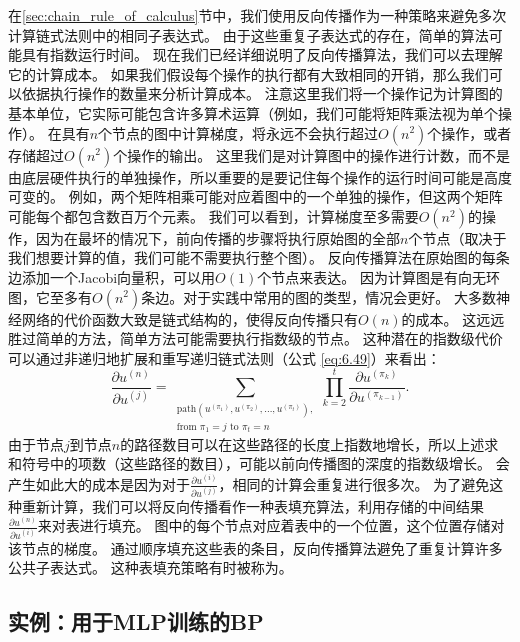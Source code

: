   
在\ref{sec:chain_rule_of_calculus}节中，我们使用反向传播作为一种策略来避免多次计算链式法则中的相同子表达式。
由于这些重复子表达式的存在，简单的算法可能具有指数运行时间。
现在我们已经详细说明了反向传播算法，我们可以去理解它的计算成本。
如果我们假设每个操作的执行都有大致相同的开销，那么我们可以依据执行操作的数量来分析计算成本。
注意这里我们将一个操作记为计算图的基本单位，它实际可能包含许多算术运算（例如，我们可能将矩阵乘法视为单个操作）。
在具有$n$个节点的图中计算梯度，将永远不会执行超过$O(n^2)$个操作，或者存储超过$O(n^2)$个操作的输出。
这里我们是对计算图中的操作进行计数，而不是由底层硬件执行的单独操作，所以重要的是要记住每个操作的运行时间可能是高度可变的。
例如，两个矩阵相乘可能对应着图中的一个单独的操作，但这两个矩阵可能每个都包含数百万个元素。
我们可以看到，计算梯度至多需要$O(n^2)$的操作，因为在最坏的情况下，前向传播的步骤将执行原始图的全部$n$个节点（取决于我们想要计算的值，我们可能不需要执行整个图）。
反向传播算法在原始图的每条边添加一个Jacobi向量积，可以用$O(1)$个节点来表达。
因为计算图是有向无环图，它至多有$O(n^2)$条边。对于实践中常用的图的类型，情况会更好。
大多数神经网络的代价函数大致是链式结构的，使得反向传播只有$O(n)$的成本。
这远远胜过简单的方法，简单方法可能需要执行指数级的节点。
这种潜在的指数级代价可以通过非递归地扩展和重写递归链式法则（公式
\ref{eq:6.49}）来看出：
\begin{equation}
  \frac{\partial u^{(n)}}{\partial u^{(j)}} =
  \sum_{\substack{\text{path}(u^{(\pi_1)}, u^{(\pi_2)}, \ldots, u^{(\pi_t)}  ),\\ \text{from } \pi_1=j \text{ to }\pi_t = n}}
  \prod_{k=2}^t \frac{\partial u^{(\pi_k)}}{\partial u^{(\pi_{k-1})}}.
\end{equation}
由于节点$j$到节点$n$的路径数目可以在这些路径的长度上指数地增长，所以上述求和符号中的项数（这些路径的数目），可能以前向传播图的深度的指数级增长。
会产生如此大的成本是因为对于$\frac{\partial u^{(i)}}{\partial u^{(j)}}$，相同的计算会重复进行很多次。
为了避免这种重新计算，我们可以将反向传播看作一种表填充算法，利用存储的中间结果$\frac{\partial u^{(n)}}{\partial u^{(i)}}$来对表进行填充。
图中的每个节点对应着表中的一个位置，这个位置存储对该节点的梯度。
通过顺序填充这些表的条目，反向传播算法避免了重复计算许多公共子表达式。
这种表填充策略有时被称为。
  
  
\subsection{实例：用于MLP训练的BP}
\label{sec:example_back_propagation_for_mlp_Training}

